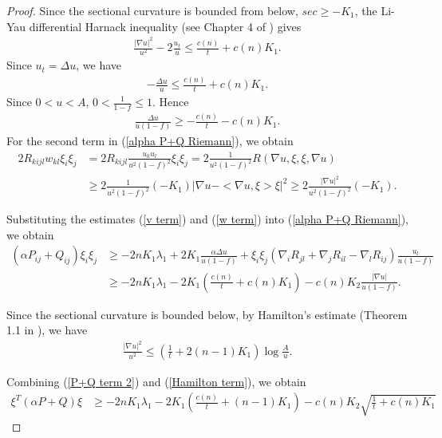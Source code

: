 \documentclass{amsart}
\theoremstyle{definition}
\theoremstyle{remark}
\numberwithin{equation}{section}
\begin{document}
\begin{proof}
Since the sectional curvature is bounded from below, $sec\geq -K_{1}$, the Li-Yau differential Harnack inequality (see Chapter 4 of \cite{S-Y}) gives 
\begin{align}\label{local laplace estimate}
\frac{|\nabla u|^{2}}{u^{2}}-2\frac{u_{t}}{u}\leq \frac{c(n)}{t}+c(n)K_{1}.
\end{align}
Since $u_{t}=\Delta u$, we have 
\begin{align*}
-\frac{\Delta u}{u}\leq \frac{c(n)}{t}+c(n)K_{1}.
\end{align*}
Since $0<u<A$,  $0<\frac{1}{1-f}\leq 1$.
Hence 
\begin{align*}
\frac{\Delta u}{u(1-f)}\geq -\frac{c(n)}{t}-c(n)K_{1}.
\end{align*}
For the second term in (\ref{alpha P+Q Riemann}), we obtain
\begin{align}\label{w term}
2R_{kijl}w_{kl}\xi_{i}\xi_{j}&=2R_{kijl}\frac{u_{k}u_{l}}{u^{2}(1-f)^{2}}\xi_{i}\xi_{j}=2\frac{1}{u^{2}(1-f)^{2}}R(\nabla u,\xi,\xi,\nabla u)\nonumber\\
&\geq 2\frac{1}{u^{2}(1-f)^{2}}(-K_{1})|\nabla u-<\nabla u,\xi>\xi|^{2}\geq 2\frac{|\nabla u|^{2}}{u^{2}(1-f)^{2}}(-K_{1}).
\end{align}

Substituting the estimates (\ref{v term}) and (\ref{w term}) into (\ref{alpha P+Q Riemann}), we obtain 
\begin{align}
\label{P+Q term 21}(\alpha P_{ij}+Q_{ij})\xi_{i}\xi_{j}&\geq -2nK_{1}\lambda_{1}+2K_{1}\frac{\alpha \Delta u}{u(1-f)}+\xi_{i}\xi_{j}(\nabla_{i}R_{jl}+\nabla_{j}R_{il}-\nabla_{l}R_{ij})\frac{u_{l}}{u(1-f)}\\
&\label{P+Q term 2}\geq -2nK_{1}\lambda_{1}-2K_{1}(\frac{c(n)}{t}+c(n)K_{1})-c(n)K_{2}\frac{|\nabla u|}{u(1-f)}.
\end{align}




Since the sectional curvature is bounded below, by Hamilton's estimate (Theorem 1.1 in \cite{Hamilton}), we have 
\begin{align}\label{Hamilton term}
\frac{|\nabla u|^{2}}{u^{2}}\leq (\frac{1}{t}+2(n-1)K_{1})\log \frac{A}{u}.
\end{align}

Combining (\ref{P+Q term 2}) and (\ref{Hamilton term}), we obtain 
\begin{align}\label{P+Q term 3}
\xi^{T}(\alpha P+Q)\xi&\geq  -2nK_{1}\lambda_{1}-2K_{1}(\frac{c(n)}{t}+(n-1)K_{1})-c(n)K_{2}\sqrt{\frac{1}{t}+c(n)K_{1}}
\end{align}


\end{proof}
\end{document}

